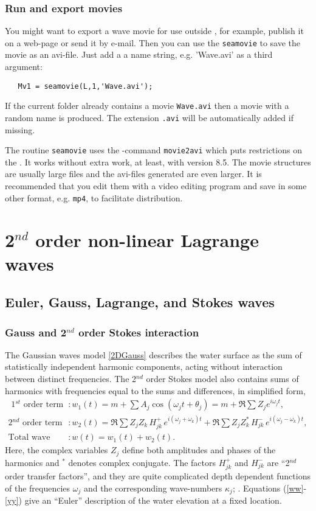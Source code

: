 \subsection{Run and export movies}
You might want to export a wave movie for use outside \ML{}, 
for example, publish it on a web-page or send it by e-mail. 
Then you can use the \verb+seamovie+ to save the movie as an avi-file. Just add a a name string, e.g. 'Wave.avi' as a third argument: 
{\small\begin{verbatim}
   Mv1 = seamovie(L,1,'Wave.avi');
\end{verbatim}
}
\noindent
If the current folder already contains a movie {\tt Wave.avi} then a movie with a random name is produced. The extension {\tt .avi} will be automatically added if missing. 

The routine {\tt seamovie} uses the \ML{}-command {\tt movie2avi} which puts restrictions on the . It works without extra work, at least, with version 8.5. 
The movie structures are usually large files and the avi-files generated are even larger. 
It is recommended that you edit them with a video editing program and save in some other format, e.g. {\tt mp4}, to facilitate distribution. 

\chapter{2$^{nd}$ order non-linear Lagrange waves}\label{Secondorderwaves}
\section{Euler, Gauss, Lagrange, and Stokes waves}
\subsection{Gauss and 2$^{nd}$ order Stokes interaction}
The Gaussian waves model \eqref{2DGauss} describes the water surface as the sum of statistically independent harmonic components, acting without interaction between distinct frequencies. The 2$^{nd}$ order Stokes model also contains sums of harmonics with frequencies equal to the sums and differences, in simplified form, 
\begin{align}
\text{ 1$^{st}$ order term} &: w_1(t) = m + \sum A_j \cos ( \omega_j t + \theta _j) 
= m +\Re \sum Z_j e^{i \omega_j t}, \label{ww} \\
\text{2$^{nd}$ order term} &: w_2 (t) = 
\Re \sum Z_j Z_k \, H_{jk}^+ \, e^{i(\omega_j + \omega_k) t}  +
\Re \sum Z_j Z_k^* \, H_{jk}^- \, e^{i(\omega_j - \omega_k) t} ,  \label{yy} \\
\text{Total wave} &: w(t)  = w_1(t) + w_2(t). \nonumber
\end{align} 
Here, the complex variables $Z_j$ define both amplitudes and phases 
of the harmonics and $^*$ denotes complex conjugate. The factors $H_{jk}^+$ and  
$H_{jk}^-$ are ``2$^{nd}$ order transfer factors'', and they are quite complicated depth dependent functions of the frequencies $\omega_j$ and the corresponding wave-numbers $\kappa_j$;  \cite{MarthinsenAndWinterstein1992Skewness,Nouguieretal2015,Prevosto1998}. Equations (\ref{ww}-\ref{yy}) give an ``Euler'' description of the water elevation at a fixed location. 


